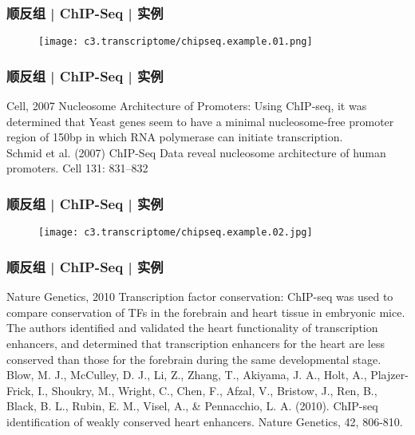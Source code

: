 \begin{frame}
  \frametitle{顺反组 | ChIP-Seq | 实例}
  \begin{figure}
    \centering
    \texttt{[image: c3.transcriptome/chipseq.example.01.png]}
  \end{figure}
\end{frame}

\begin{frame}
  \frametitle{顺反组 | ChIP-Seq | 实例}
  \begin{block}{Cell, 2007}
  Nucleosome Architecture of Promoters: Using ChIP-seq, it was determined that Yeast genes seem to have a minimal nucleosome-free promoter region of 150bp in which RNA polymerase can initiate transcription.\\
  \vspace{0.5em}
  Schmid et al. (2007) ChIP-Seq Data reveal nucleosome architecture of human promoters. Cell 131: 831–832
  \end{block}
\end{frame}

\begin{frame}
  \frametitle{顺反组 | ChIP-Seq | 实例}
  \begin{figure}
    \centering
    \texttt{[image: c3.transcriptome/chipseq.example.02.jpg]}
  \end{figure}
\end{frame}

\begin{frame}
  \frametitle{顺反组 | ChIP-Seq | 实例}
  \begin{block}{Nature Genetics, 2010}
  Transcription factor conservation: ChIP-seq was used to compare conservation of TFs in the forebrain and heart tissue in embryonic mice. The authors identified and validated the heart functionality of transcription enhancers, and determined that transcription enhancers for the heart are less conserved than those for the forebrain during the same developmental stage.\\
  \vspace{0.5em}
  Blow, M. J., McCulley, D. J., Li, Z., Zhang, T., Akiyama, J. A., Holt, A., Plajzer-Frick, I., Shoukry, M., Wright, C., Chen, F., Afzal, V., Bristow, J., Ren, B., Black, B. L., Rubin, E. M., Visel, A., \& Pennacchio, L. A. (2010). ChIP-seq identification of weakly conserved heart enhancers. Nature Genetics, 42, 806-810.
  \end{block}
\end{frame}

